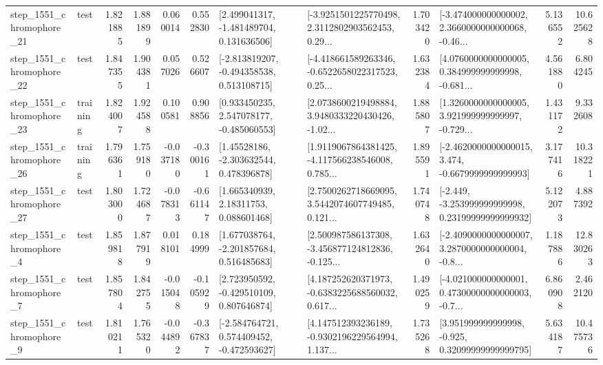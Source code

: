 \begin{tabular}{llrrrrllrlrr}
 step\_1551\_chromophore\_21 &      test &      1.821885 &    1.881899 &      0.060014 &  0.552830 &    [2.499041317, -1.481489704, 0.131636506] &  [-3.9251501225770498, 2.3112802903562453, 0.29... &       1.703420 &  [-3.474000000000002, 2.3660000000000068, -0.46... &            5.136552 &         10.625628 \\
 step\_1551\_chromophore\_22 &      test &      1.847355 &    1.904381 &      0.057026 &  0.526607 &   [-2.813819207, -0.494358538, 0.513108715] &  [-4.418661589263346, -0.6522658022317523, 0.25... &       1.632384 &  [4.0760000000000005, 0.384999999999998, -0.681... &            4.561880 &          6.804245 \\
 step\_1551\_chromophore\_23 &  training &      1.824007 &    1.924588 &      0.100581 &  0.908856 &    [0.933450235, 2.547078177, -0.485060553] &  [2.0738600219498884, 3.9480333220430426, -1.02... &       1.885807 &  [1.3260000000000005, 3.921999999999997, -0.729... &            1.431172 &          9.332608 \\
 step\_1551\_chromophore\_26 &  training &      1.796361 &    1.759180 &     -0.037180 & -0.300161 &     [1.45528186, -2.303632544, 0.478396878] &  [1.9119067864381425, -4.117566238546008, 0.785... &       1.895591 &  [-2.4620000000000015, 3.474, -0.6679999999999993] &            3.177416 &         10.318221 \\
 step\_1551\_chromophore\_27 &      test &      1.803000 &    1.724687 &     -0.078313 & -0.661147 &      [1.665340939, 2.18311753, 0.088601468] &  [2.7500262718669095, 3.5442074607749485, 0.121... &       1.740748 &  [-2.449, -3.253999999999998, 0.23199999999999932] &            5.122073 &          4.887392 \\
  step\_1551\_chromophore\_4 &      test &      1.859818 &    1.877919 &      0.018101 &  0.184999 &    [1.677038764, -2.201857684, 0.516485683] &  [2.500987586137308, -3.456877124812836, -0.125... &       1.632640 &  [-2.4090000000000007, 3.2870000000000004, -0.8... &            1.187886 &         12.830263 \\
  step\_1551\_chromophore\_7 &      test &      1.857804 &    1.842755 &     -0.015048 & -0.105929 &    [2.723950592, -0.429510109, 0.807646874] &  [4.187252620371973, -0.6383225688560032, 0.617... &       1.490259 &  [-4.021000000000001, 0.47300000000000003, -0.7... &            6.860908 &          2.462120 \\
  step\_1551\_chromophore\_9 &      test &      1.810211 &    1.765320 &     -0.044892 & -0.367837 &   [-2.584764721, 0.574409452, -0.472593627] &  [4.147512393236189, -0.9302196229564994, 1.137... &       1.735268 &   [3.951999999999998, -0.925, 0.32099999999999795] &            5.634187 &         10.475736 \\

\end{tabular}
